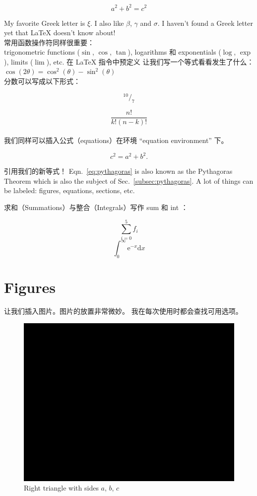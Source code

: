 \documentclass[12pt,UTF8]{article}
\begin{document}
\[a^2 + b^2 = c^2 \]

My favorite Greek letter is $\xi$. I also like $\beta$, $\gamma$ and $\sigma$.
I haven't found a Greek letter yet that \LaTeX \hspace{1pt} doesn't know
about! \\

常用函数操作符同样很重要： \\
trigonometric functions ($\sin$, $\cos$, $\tan$), 
logarithms 和 exponentials ($\log$, $\exp$), 
limits ($\lim$), etc. 
在 LaTeX 指令中预定义 
让我们写一个等式看看发生了什么：
$\cos(2\theta) = \cos^{2}(\theta) - \sin^{2}(\theta)$ \\

分数可以写成以下形式：

$$ ^{10}/_{7} $$

$$ \frac{n!}{k!(n - k)!} $$ \\

我们同样可以插入公式（equations）在环境 ``equation environment'' 下。

\begin{equation} %
    c^2 = a^2 + b^2.
    \label{eq:pythagoras} %
\end{equation} %

引用我们的新等式！
Eqn.~\ref{eq:pythagoras} is also known as the Pythagoras Theorem which is also
the subject of Sec.~\ref{subsec:pythagoras}. A lot of things can be labeled: 
figures, equations, sections, etc.

求和（Summations）与整合（Integrals）写作 sum 和 int ：


\begin{equation} 
  \sum_{i=0}^{5} f_{i}
\end{equation} 
\begin{equation} 
  \int_{0}^{\infty} \mathrm{e}^{-x} \mathrm{d}x
\end{equation} 

\section{Figures}

让我们插入图片。图片的放置非常微妙。
我在每次使用时都会查找可用选项。

\begin{figure}[H] %
    \centering %
    \includegraphics[width=0.3\linewidth]{black.png} 
    \caption{Right triangle with sides $a$, $b$, $c$}
    \label{fig:right-triangle}
\end{figure}
\end{document}
